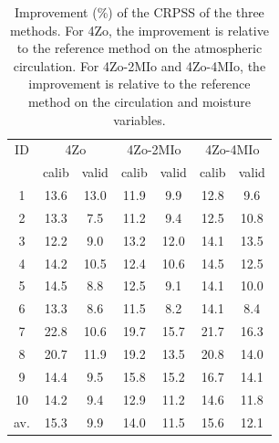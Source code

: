 \documentclass[5p]{elsarticle}
\begin{document}
\begin{table}[htbp]
	\caption{Improvement (\%) of the CRPSS of the three methods. For 4Zo, the improvement is relative to the reference method on the atmospheric circulation. For 4Zo-2MIo and 4Zo-4MIo, the improvement is relative to the reference method on the circulation and moisture variables.}
	\footnotesize
	\begin{center}
		\begin{tabular}{ccccccc}
			\hline 
			ID & \multicolumn{2}{c}{4Zo} & \multicolumn{2}{c}{4Zo-2MIo} & \multicolumn{2}{c}{4Zo-4MIo} \\ 
			& calib & valid & calib & valid & calib & valid \\ 
			\hline 
			1 & 13.6 & 13.0 & 11.9 & 9.9 & 12.8 & 9.6 \\
			2 & 13.3 & 7.5 & 11.2 & 9.4 & 12.5 & 10.8 \\
			3 & 12.2 & 9.0 & 13.2 & 12.0 & 14.1 & 13.5 \\
			4 & 14.2 & 10.5 & 12.4 & 10.6 & 14.5 & 12.5 \\
			5 & 14.5 & 8.8 & 12.5 & 9.1 & 14.1 & 10.0 \\
			6 & 13.3 & 8.6 & 11.5 & 8.2 & 14.1 & 8.4 \\
			7 & 22.8 & 10.6 & 19.7 & 15.7 & 21.7 & 16.3 \\
			8 & 20.7 & 11.9 & 19.2 & 13.5 & 20.8 & 14.0 \\
			9 & 14.4 & 9.5 & 15.8 & 15.2 & 16.7 & 14.1 \\
			10 & 14.2 & 9.4 & 12.9 & 11.2 & 14.6 & 11.8 \\
			\hline
			av. & 15.3 & 9.9 & 14.0 & 11.5 & 15.6 & 12.1 \\ 
			\hline 
		\end{tabular} 
	\end{center}
	\label{table:scores_diff}
\end{table}
\end{document}
